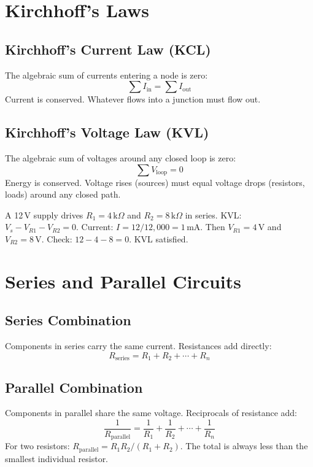 \documentclass[11pt,letterpaper,twoside,openany]{book}
\begin{document}
\section{Kirchhoff's Laws}

\subsection{Kirchhoff's Current Law (KCL)}
The algebraic sum of currents entering a node is zero:
\begin{equation}
\sum I_{\text{in}} = \sum I_{\text{out}}
\end{equation}
Current is conserved. Whatever flows into a junction must flow out.

\subsection{Kirchhoff's Voltage Law (KVL)}
The algebraic sum of voltages around any closed loop is zero:
\begin{equation}
\sum V_{\text{loop}} = 0
\end{equation}
Energy is conserved. Voltage rises (sources) must equal voltage drops (resistors, loads) around any closed path.

\begin{tipbox}
A 12\,V supply drives $R_1 = 4\,\text{k}\Omega$ and $R_2 = 8\,\text{k}\Omega$ in series. KVL: $V_s - V_{R1} - V_{R2} = 0$. Current: $I = 12/12{,}000 = 1\,\text{mA}$. Then $V_{R1} = 4\,\text{V}$ and $V_{R2} = 8\,\text{V}$. Check: $12 - 4 - 8 = 0$. KVL satisfied.
\end{tipbox}


\section{Series and Parallel Circuits}

\subsection{Series Combination}
Components in series carry the same current. Resistances add directly:
\begin{equation}
R_{\text{series}} = R_1 + R_2 + \cdots + R_n
\end{equation}

\subsection{Parallel Combination}
Components in parallel share the same voltage. Reciprocals of resistance add:
\begin{equation}
\frac{1}{R_{\text{parallel}}} = \frac{1}{R_1} + \frac{1}{R_2} + \cdots + \frac{1}{R_n}
\end{equation}
For two resistors: $R_{\text{parallel}} = R_1 R_2 / (R_1 + R_2)$. The total is always less than the smallest individual resistor.
\end{document}
